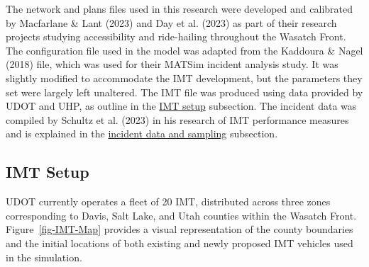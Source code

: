\documentclass[fancy, oneside, mastersfancy, ms]{byuthesis}
\begin{document}
The network and plans files used in this research were developed and
calibrated by Macfarlane \& Lant (2023) and Day et al. (2023) as part of
their research projects studying accessibility and ride-hailing
throughout the Wasatch Front. The configuration file used in the model
was adapted from the Kaddoura \& Nagel (2018) file, which was used for
their MATSim incident analysis study. It was slightly modified to
accommodate the IMT development, but the parameters they set were
largely left unaltered. The IMT file was produced using data provided by
UDOT and UHP, as outline in the \protect\hyperlink{sec-MATSim_mod}{IMT
setup} subsection. The incident data was compiled by Schultz et al.
(2023) in his research of IMT performance measures and is explained in
the \protect\hyperlink{sec-inc_data}{incident data and sampling}
subsection.

\hypertarget{sec-IMT_setup}{%
\subsection{IMT Setup}\label{sec-IMT_setup}}

UDOT currently operates a fleet of 20 IMT, distributed across three
zones corresponding to Davis, Salt Lake, and Utah counties within the
Wasatch Front. Figure~\ref{fig-IMT-Map} provides a visual representation
of the county boundaries and the initial locations of both existing and
newly proposed IMT vehicles used in the simulation.
\end{document}
